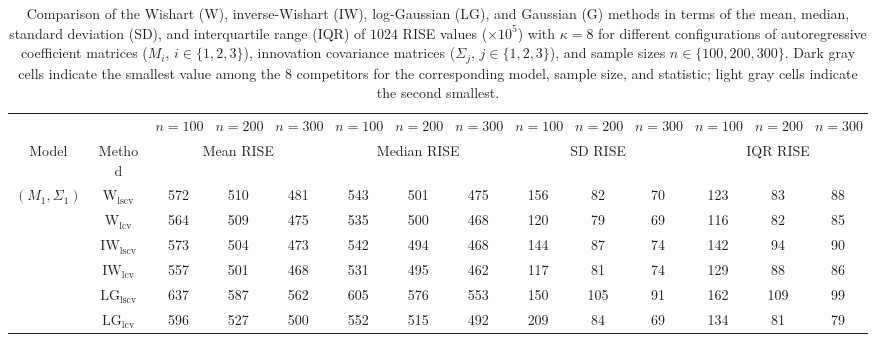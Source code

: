 \begin{table}[!ht]
\caption{Comparison of the Wishart (W), inverse-Wishart (IW), log-Gaussian (LG), and Gaussian (G) methods in terms of the mean, median, standard deviation (SD), and interquartile range (IQR) of $1024$ RISE values ($\times 10^5$) with $\kappa = 8$ for different configurations of autoregressive coefficient matrices ($M_i, \, i\in \{1,2,3\}$), innovation covariance matrices ($\Sigma_j, \, j\in \{1,2,3\}$), and sample sizes $n \in \{100, 200, 300\}$. Dark gray cells indicate the smallest value among the 8 competitors for the corresponding model, sample size, and statistic; light gray cells indicate the second smallest.}
\label{tab:summary}

\fontsize{7.9}{7}\selectfont\renewcommand{\arraystretch}{0}
\setlength{\tabcolsep}{1.2pt}
\setlength{\aboverulesep}{0.35ex}
\setlength{\belowrulesep}{0.35ex}
\centering
{
\begin{tabular}{@{}cc|ccc|ccc|ccc|ccc@{}}
\toprule
\multicolumn{2}{c|}{} & $n = 100$ & $n = 200$ & $n = 300$ & $n = 100$ & $n = 200$ & $n = 300$ & $n = 100$ & $n = 200$ & $n = 300$ & $n = 100$ & $n = 200$ & $n = 300$ \\
\cmidrule(r){1-2}\cmidrule(lr){3-5}\cmidrule(lr){6-8}\cmidrule(lr){9-11}\cmidrule(l){12-14}
Model & Method & \multicolumn{3}{c|}{Mean RISE} & \multicolumn{3}{c|}{Median RISE} & \multicolumn{3}{c|}{SD RISE} & \multicolumn{3}{c}{IQR RISE} \\
\midrule
$(M_1,\Sigma_1)$ & $\mathrm{W}_{\mathrm{lscv}}$ & 572 & 510 & 481 & 543 & 501 & 475 & 156 & 82 & 70 & 123 & 83 & 88 \\ 
 & $\mathrm{W}_{\mathrm{lcv}}$ & \cellcolor{black!10}564 & 509 & 475 & \cellcolor{black!10}535 & 500 & 468 & 120 & \cellcolor{black!30}79 & \cellcolor{black!10}69 & 116 & 82 & 85 \\ 
 & $\mathrm{IW}_{\mathrm{lscv}}$ & 573 & \cellcolor{black!10}504 & \cellcolor{black!10}473 & 542 & \cellcolor{black!30}494 & \cellcolor{black!10}468 & 144 & 87 & 74 & 142 & 94 & 90 \\ 
 & $\mathrm{IW}_{\mathrm{lcv}}$ & \cellcolor{black!30}557 & \cellcolor{black!30}501 & \cellcolor{black!30}468 & \cellcolor{black!30}531 & \cellcolor{black!10}495 & \cellcolor{black!30}462 & \cellcolor{black!10}117 & \cellcolor{black!10}81 & 74 & 129 & 88 & 86 \\ 
 & $\mathrm{LG}_{\mathrm{lscv}}$ & 637 & 587 & 562 & 605 & 576 & 553 & 150 & 105 & 91 & 162 & 109 & 99 \\ 
 & $\mathrm{LG}_{\mathrm{lcv}}$ & 596 & 527 & 500 & 552 & 515 & 492 & 209 & 84 & \cellcolor{black!30}69 & 134 & \cellcolor{black!10}81 & \cellcolor{black!30}79 \\ 

\end{tabular}}
\end{table}
